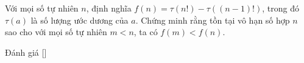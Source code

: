 \ifshowproblem
\begin{problem}\label{problem:CHN-2015-TST3-P6}
	Với mọi số tự nhiên $n$, định nghĩa $f(n) = \tau(n!) - \tau((n - 1)!)$, trong đó $\tau(a)$ là số lượng ước dương của $a$.
	Chứng minh rằng tồn tại vô hạn số hợp $n$ sao cho với mọi số tự nhiên $m < n$, ta có $f(m) < f(n)$.
\end{problem}
\fi

\ifshowinfo
Đánh giá [\textbf{}]\footnotemark
{}
\fi